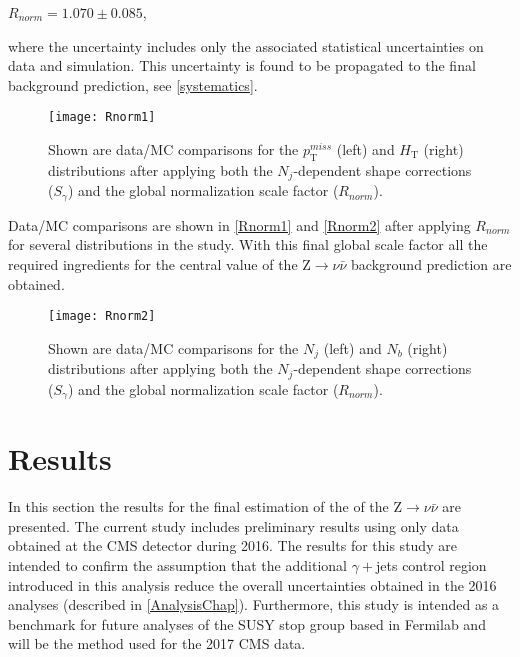 \begingroup
	\begin{center}
		$R_{norm} = 1.070 \pm 0.085$,
	\end{center}
\endgroup

\noindent where the uncertainty includes only the associated statistical uncertainties on data and simulation. This uncertainty is found to be propagated to the final background prediction, see \autoref{systematics}.\\

\begin{figure}[H]
\begin{center}
\texttt{[image: Rnorm1]}
\end{center}
\vspace{-1em}
\caption{Shown are data/MC comparisons for the $p_\text{T}^{miss}$ (left) and $H_\text{T}$ (right) distributions after applying both the $N_j$-dependent shape corrections ($S_\gamma$) and the global normalization scale factor ($R_{norm}$).}
\label{Rnorm1}
\end{figure}

\vspace{1em}

Data/MC comparisons are shown in \autoref{Rnorm1} and \autoref{Rnorm2} after applying $R_{norm}$ for several distributions in the study. With this final global scale factor all the required ingredients for the central value of the Z$\rightarrow\nu\bar{\nu}$ background prediction are obtained. 

\begin{figure}[H]
\begin{center}
\texttt{[image: Rnorm2]}
\end{center}
\vspace{-1em}
\caption{Shown are data/MC comparisons for the $N_j$ (left) and $N_b$ (right) distributions after applying both the $N_j$-dependent shape corrections ($S_\gamma$) and the global normalization scale factor ($R_{norm}$).}
\label{Rnorm2}
\end{figure}

\section{Results}

In this section the results for the final estimation of the of the Z$\rightarrow\nu\bar{\nu}$ are presented. The current study includes preliminary results using only data obtained at the CMS detector during 2016. The results for this study are intended to confirm the assumption that the additional $\gamma+$jets control region introduced in this analysis reduce the overall uncertainties obtained in the 2016 analyses (described in \autoref{AnalysisChap}). Furthermore, this study is intended as a benchmark for future analyses of the SUSY stop group based in Fermilab and will be the method used for the 2017 CMS data.

